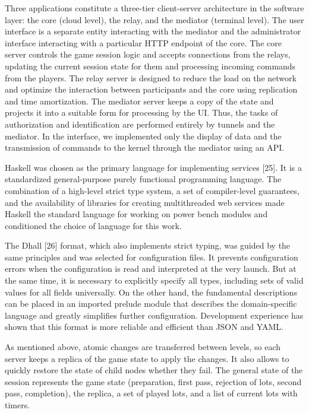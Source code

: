 \documentclass[
]{ceurart}
\begin{document}
Three applications constitute a three-tier client-server architecture in the software layer: the core (cloud level), the relay, and the mediator (terminal level). The user interface is a separate entity interacting with the mediator and the administrator interface interacting with a particular HTTP endpoint of the core. The core server controls the game session logic and accepts connections from the relays, updating the current session state for them and processing incoming commands from the players. The relay server is designed to reduce the load on the network and optimize the interaction between participants and the core using replication and time amortization. The mediator server keeps a copy of the state and projects it into a suitable form for processing by the UI. Thus, the tasks of authorization and identification are performed entirely by tunnels and the mediator. In the interface, we implemented only the display of data and the transmission of commands to the kernel through the mediator using an API.

Haskell was chosen as the primary language for implementing services [25]. It is a standardized general-purpose purely functional programming language. The combination of a high-level strict type system, a set of compiler-level guarantees, and the availability of libraries for creating multithreaded web services made Haskell the standard language for working on power bench modules and conditioned the choice of language for this work.

The Dhall [26] format, which also implements strict typing, was guided by the same principles and was selected for configuration files. It prevents configuration errors when the configuration is read and interpreted at the very launch. But at the same time, it is necessary to explicitly specify all types, including sets of valid values ​​for all fields universally. On the other hand, the fundamental descriptions can be placed in an imported prelude module that describes the domain-specific language and greatly simplifies further configuration. Development experience has shown that this format is more reliable and efficient than JSON and YAML.

As mentioned above, atomic changes are transferred between levels, so each server keeps a replica of the game state to apply the changes. It also allows to quickly restore the state of child nodes whether they fail. The general state of the session represents the game state (preparation, first pass, rejection of lots, second pass, completion), the replica, a set of played lots, and a list of current lots with timers.
\end{document}
